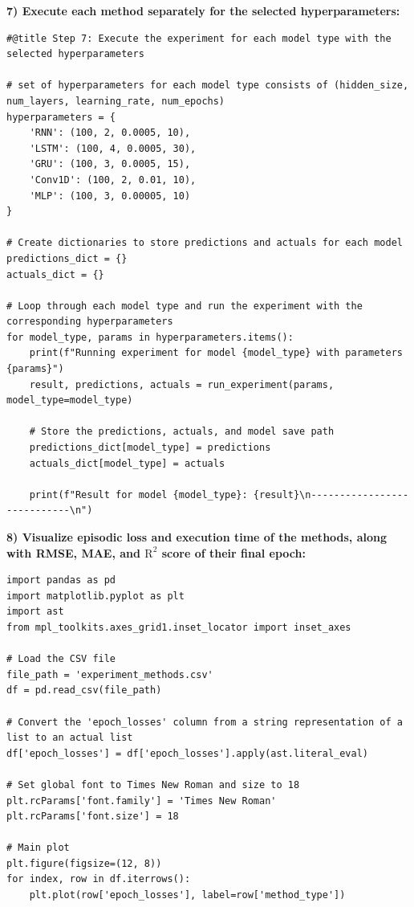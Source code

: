 \documentclass[journal,onecolumn]{IEEEtran}
\begin{document}
{\begin{appendices}
\textbf{7) Execute each method separately for the selected hyperparameters: }
\begin{verbatim}
#@title Step 7: Execute the experiment for each model type with the selected hyperparameters

# set of hyperparameters for each model type consists of (hidden_size, num_layers, learning_rate, num_epochs)
hyperparameters = {
    'RNN': (100, 2, 0.0005, 10),
    'LSTM': (100, 4, 0.0005, 30),
    'GRU': (100, 3, 0.0005, 15),
    'Conv1D': (100, 2, 0.01, 10),
    'MLP': (100, 3, 0.00005, 10)
}

# Create dictionaries to store predictions and actuals for each model
predictions_dict = {}
actuals_dict = {}

# Loop through each model type and run the experiment with the corresponding hyperparameters
for model_type, params in hyperparameters.items():
    print(f"Running experiment for model {model_type} with parameters {params}")
    result, predictions, actuals = run_experiment(params, model_type=model_type)

    # Store the predictions, actuals, and model save path
    predictions_dict[model_type] = predictions
    actuals_dict[model_type] = actuals

    print(f"Result for model {model_type}: {result}\n----------------------------\n")
\end{verbatim}

\textbf{8) Visualize episodic loss and execution time of the methods, along with RMSE, MAE, and $\text{R}^2$ score of their final epoch: }
\begin{verbatim}
import pandas as pd
import matplotlib.pyplot as plt
import ast
from mpl_toolkits.axes_grid1.inset_locator import inset_axes

# Load the CSV file
file_path = 'experiment_methods.csv'
df = pd.read_csv(file_path)

# Convert the 'epoch_losses' column from a string representation of a list to an actual list
df['epoch_losses'] = df['epoch_losses'].apply(ast.literal_eval)

# Set global font to Times New Roman and size to 18
plt.rcParams['font.family'] = 'Times New Roman'
plt.rcParams['font.size'] = 18

# Main plot
plt.figure(figsize=(12, 8))
for index, row in df.iterrows():
    plt.plot(row['epoch_losses'], label=row['method_type'])


\end{verbatim}
\end{appendices}}
\end{document}
